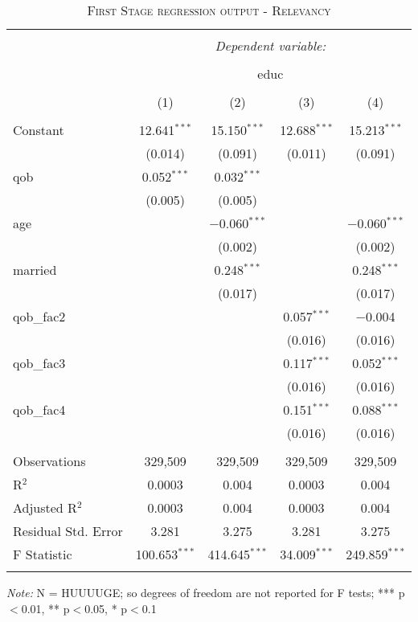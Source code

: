 \documentclass[a4paper]{article}
\begin{document}
\begin{table}[!htbp] \centering 
\begin{adjustwidth}{0.cm}{-0cm}
\begin{threeparttable}
\small
\captionsetup{font=small, justification=raggedright,singlelinecheck=false}
\caption{\textsc{First Stage regression output - Relevancy}}
\centering 
  \label{}
\small 
\begin{tabular}{@{\extracolsep{-2pt}}lcccc} 
\\[-5.8ex]\hline 
\hline \\[-1.8ex] 
 & \multicolumn{4}{c}{\textit{Dependent variable:}} \\ 
\cline{2-5} 
\\[-1.8ex] & \multicolumn{4}{c}{educ} \\ 
\\[-1.8ex] & (1) & (2) & (3) & (4)\\ 
\hline \\[-1.8ex] 
 Constant & 12.641$^{***}$ & 15.150$^{***}$ & 12.688$^{***}$ & 15.213$^{***}$ \\ 
  & (0.014) & (0.091) & (0.011) & (0.091) \\ 
  qob & 0.052$^{***}$ & 0.032$^{***}$ &  &  \\ 
  & (0.005) & (0.005) &  &  \\ 
  age &  & $-$0.060$^{***}$ &  & $-$0.060$^{***}$ \\ 
  &  & (0.002) &  & (0.002) \\ 
  married &  & 0.248$^{***}$ &  & 0.248$^{***}$ \\ 
  &  & (0.017) &  & (0.017) \\ 
  qob\_fac2 &  &  & 0.057$^{***}$ & $-$0.004 \\ 
  &  &  & (0.016) & (0.016) \\ 
  qob\_fac3 &  &  & 0.117$^{***}$ & 0.052$^{***}$ \\ 
  &  &  & (0.016) & (0.016) \\ 
  qob\_fac4 &  &  & 0.151$^{***}$ & 0.088$^{***}$ \\ 
  &  &  & (0.016) & (0.016) \\ 
 \hline \\[-1.8ex] 
Observations & 329,509 & 329,509 & 329,509 & 329,509 \\ 
R$^{2}$ & 0.0003 & 0.004 & 0.0003 & 0.004 \\ 
Adjusted R$^{2}$ & 0.0003 & 0.004 & 0.0003 & 0.004 \\ 
Residual Std. Error & 3.281 & 3.275 & 3.281  & 3.275  \\ 
F Statistic & 100.653$^{***}$  & 414.645$^{***}$ & 34.009$^{***}$ & 249.859$^{***}$  \\ 
\hline 
\hline \\[-3.5ex] 
\end{tabular} 
\begin{tablenotes}
      \small
      \item\textit{Note:} N = HUUUUGE; so degrees of freedom are not reported for F tests; *** p$<$0.01, ** p$<$0.05, * p$<$0.1
    \end{tablenotes}
\end{threeparttable}
\end{adjustwidth}
%
\end{table}
\end{document}

